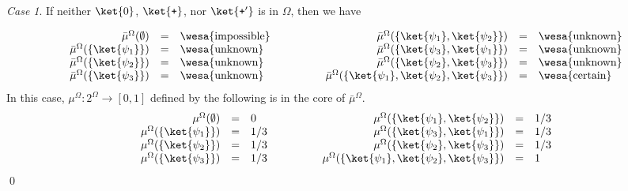 \documentclass{article}
\theoremstyle{remark}
\newtheorem{case}{Case}
\newcommand{\pmeas}{\ensuremath{\mu}}
\newcommand{\ps}{\texttt{+}}
\newcommand{\imposs}{{\mbox{\wesa{impossible}}}}
\newcommand{\necess}{{\mbox{\wesa{certain}}}}
\newcommand{\unknown}{{\mbox{\wesa{unknown}}}}
\begin{document}
\begin{case}If neither $\ket{0}$, $\ket{\ps}$, nor $\ket{\ps'}$
is in $\Omega$, then we have

\[
\begin{array}{c@{\qquad\qquad}c}
\begin{array}{rcl}
\bar{\mu}^{\Omega}(\emptyset) & = & \imposs\\
\bar{\mu}^{\Omega}(\{\ket{\psi_{1}}\}) & = & \unknown\\
\bar{\mu}^{\Omega}(\{\ket{\psi_{2}}\}) & = & \unknown\\
\bar{\mu}^{\Omega}(\{\ket{\psi_{3}}\}) & = & \unknown
\end{array} & \begin{array}{rcl}
\bar{\mu}^{\Omega}(\{\ket{\psi_{1}},\ket{\psi_{2}}\}) & = & \unknown\\
\bar{\mu}^{\Omega}(\{\ket{\psi_{3}},\ket{\psi_{1}}\}) & = & \unknown\\
\bar{\mu}^{\Omega}(\{\ket{\psi_{2}},\ket{\psi_{3}}\}) & = & \unknown\\
\bar{\mu}^{\Omega}(\{\ket{\psi_{1}},\ket{\psi_{2}},\ket{\psi_{3}}\}) & = & \necess
\end{array}\end{array}
\]
In this case, $\pmeas^{\Omega}:2^{\Omega}\rightarrow\left[0,1\right]$
defined by the following is in the core of $\bar{\mu}^{\Omega}$.
\[
\begin{array}{c@{\qquad\qquad}c}
\begin{array}{rcl}
\pmeas^{\Omega}(\emptyset) & = & 0\\
\pmeas^{\Omega}(\{\ket{\psi_{1}}\}) & = & 1/3\\
\pmeas^{\Omega}(\{\ket{\psi_{2}}\}) & = & 1/3\\
\pmeas^{\Omega}(\{\ket{\psi_{3}}\}) & = & 1/3
\end{array} & \begin{array}{rcl}
\pmeas^{\Omega}(\{\ket{\psi_{1}},\ket{\psi_{2}}\}) & = & 1/3\\
\pmeas^{\Omega}(\{\ket{\psi_{3}},\ket{\psi_{1}}\}) & = & 1/3\\
\pmeas^{\Omega}(\{\ket{\psi_{2}},\ket{\psi_{3}}\}) & = & 1/3\\
\pmeas^{\Omega}(\{\ket{\psi_{1}},\ket{\psi_{2}},\ket{\psi_{3}}\}) & = & 1
\end{array}\end{array}
\]
\qed\end{case}

\end{document}
